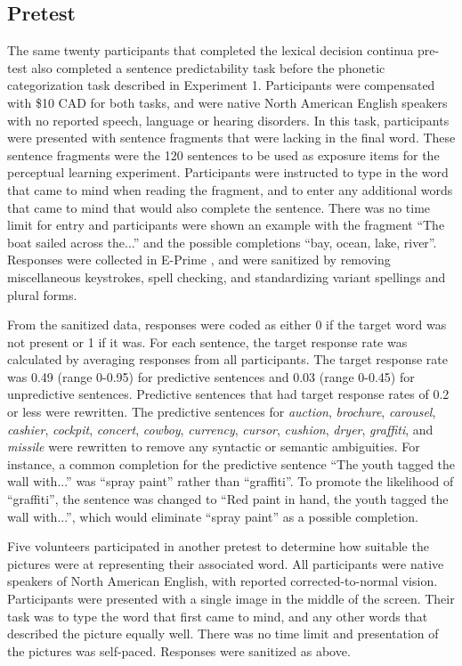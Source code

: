 \subsection{Pretest}

The same twenty participants that completed the lexical decision continua pre-test also completed a sentence predictability task before the phonetic categorization task described in Experiment 1. 
Participants were compensated with \$10 CAD for both tasks, and were native North American English speakers with no reported speech, language or hearing disorders. 
In this task, participants were presented with sentence fragments that were lacking in the final word.  
These sentence fragments were the 120 sentences to be used as exposure items for the perceptual learning experiment.
Participants were instructed to type in the word that came to mind when reading the fragment, and to enter any additional words that came to mind that would also complete the sentence.  
There was no time limit for entry and participants were shown an example with the fragment ``The boat sailed across the...'' and the possible completions ``bay, ocean, lake, river''.  
Responses were collected in E-Prime \citep{PsychologySoftwareTools2012}, and were sanitized by removing miscellaneous keystrokes, spell checking, and standardizing variant spellings and plural forms.

From the sanitized data, responses were coded as either 0 if the target word was not present or 1 if it was.
For each sentence, the target response rate was calculated by averaging responses from all participants.
The target response rate was 0.49 (range 0-0.95) for predictive sentences and 0.03 (range 0-0.45) for unpredictive sentences.
Predictive sentences that had target response rates of 0.2 or less were rewritten.  
The predictive sentences for \emph{auction}, \emph{brochure}, \emph{carousel}, \emph{cashier}, \emph{cockpit}, \emph{concert}, \emph{cowboy}, \emph{currency}, \emph{cursor}, \emph{cushion}, \emph{dryer}, \emph{graffiti}, and \emph{missile} were rewritten to remove any syntactic or semantic ambiguities.
For instance, a common completion for the predictive sentence ``The youth tagged the wall with...'' was ``spray paint'' rather than ``graffiti''.
To promote the likelihood of ``graffiti'', the sentence was changed to ``Red paint in hand, the youth tagged the wall with...'', which would eliminate ``spray paint'' as a possible completion.

Five volunteers participated in another pretest to determine how suitable the pictures were at representing their associated word.  
All participants were native speakers of North American English, with reported corrected-to-normal vision. Participants were presented with a single image in the middle of the screen.  
Their task was to type the word that first came to mind, and any other words that described the picture equally well.  
There was no time limit and presentation of the pictures was self-paced. Responses were sanitized as above.  

